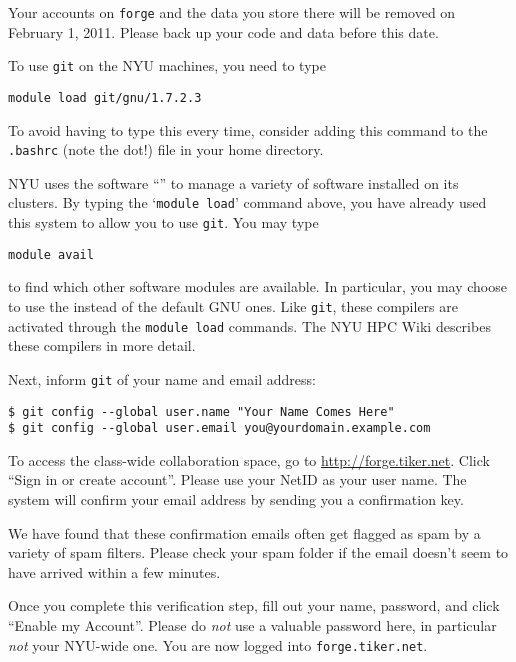 \documentclass[11pt]{article}
\begin{document}
\begin{enumerate}
\begin{note}
Your accounts on \texttt{forge} and the data you store there will be
removed on February 1, 2011. Please back up your code and data before
this date.
\end{note}

To use
\texttt{git} on the NYU machines, you need to type
\begin{lstlisting}
module load git/gnu/1.7.2.3
\end{lstlisting}
To avoid having to type this every time, consider adding this command
to the \texttt{.bashrc} (note the dot!) file in your home directory.

NYU uses the software ``'' to manage a variety of software installed on its clusters.
By typing the `\texttt{module load}' command above, you have already
used this system to allow you to use \texttt{git}. You may type
\begin{lstlisting}
module avail
\end{lstlisting}
to find which other software modules are available. In particular, you
may choose to use the
 instead of the default GNU ones. Like \texttt{git}, these
compilers are activated through the \texttt{module load} commands. The
NYU HPC Wiki describes these compilers in more detail.

Next, inform \texttt{git} of your name and email address:
\begin{lstlisting}
$ git config --global user.name "Your Name Comes Here"
$ git config --global user.email you@yourdomain.example.com
\end{lstlisting}

To access the class-wide collaboration space, go to
\url{http://forge.tiker.net}. Click ``Sign in or create account''.
Please use your NetID as your user name. The system will confirm your
email address by sending you a confirmation key.

\begin{note}
We have found that these confirmation emails often get flagged as spam
by a variety of spam filters. Please check your spam folder if the
email doesn't seem to have arrived within a few minutes.
\end{note}

Once you complete this
verification step, fill out your name, password, and click ``Enable my
Account''. Please do \emph{not} use a valuable password here, in
particular \emph{not} your NYU-wide one. You are now logged into
\texttt{forge.tiker.net}.


\end{enumerate}
\end{document}
